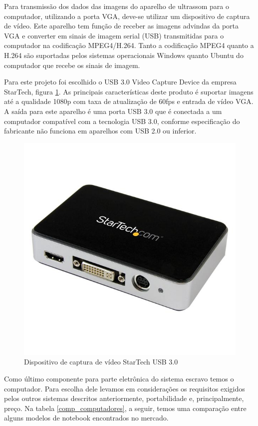 Para transmissão dos dados das imagens do aparelho de ultrassom para o computador, utilizando a porta VGA, deve-se utilizar um dispositivo de captura de vídeo. Este aparelho tem função de receber as imagens advindas da porta VGA e converter em  sinais de imagem serial (USB) transmitidas para o computador na codificação MPEG4/H.264. Tanto a codificação MPEG4 quanto a H.264 são suportadas pelos sistemas operacionais Windows quanto Ubuntu do computador que recebe os sinais de imagem.

Para este projeto foi escolhido o USB 3.0 Video Capture Device da empresa StarTech, figura \ref{des_fig22}. As principais características deste produto é suportar imagens até a qualidade 1080p com taxa de atualização de 60fps e entrada de vídeo VGA. A saída para este aparelho é uma porta USB 3.0 que é conectada a um computador compatível com a tecnologia USB 3.0, conforme especificação do fabricante não funciona em aparelhos com USB 2.0 ou inferior.
\begin{figure}[H]
	\centering	\includegraphics[keepaspectratio=true,scale=0.35]{figuras/startech.jpg}
	\caption{Dispositivo de captura de vídeo StarTech USB 3.0}
	\label{des_fig22}
\end{figure}

Como último componente para parte eletrônica do sistema escravo temos o computador. Para escolha dele levamos em considerações os requisitos exigidos pelos outros sistemas descritos anteriormente, portabilidade e, principalmente, preço. Na tabela \ref{comp_computadores}, a seguir, temos uma comparação entre alguns modelos de notebook encontrados no mercado.

